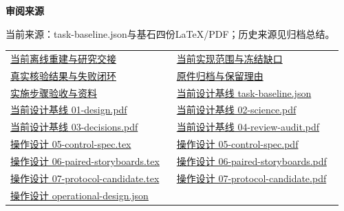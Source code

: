 \documentclass[11pt,a4paper]{article}
\newcommand{\reviewsubsection}[1]{\par\Needspace{4\baselineskip}\vspace{4pt}\begin{center}{\titlelatin\titlecjk\bfseries\fontsize{12}{18}\selectfont #1}\end{center}}
\begin{document}
\begin{minipage}{\linewidth}
\reviewsubsection{3.4 审阅来源}
当前来源：task-\allowbreak{}baseline.json与基石四份LaTeX/\allowbreak{}PDF；历史来源见归档总结。


\begingroup\small\setlength{\tabcolsep}{4pt}\begin{tabular}{@{}p{0.48\linewidth}p{0.48\linewidth}@{}}
\href{file:///D:/Agent/srp/agent/tasks/A-01/outputs/current-rebuild.md}{当前离线重建与研究交接} & \href{file:///D:/Agent/srp/agent/tasks/A-01/outputs/current-rebuild.json}{当前实现范围与冻结缺口}\\[4pt]
\href{file:///D:/Agent/srp/agent/tasks/A-01/evidence/verification.json}{真实核验结果与失败闭环} & \href{file:///D:/Agent/srp/agent/tasks/A-01/archive/README.md}{原件归档与保留理由}\\[4pt]
\href{file:///D:/Agent/srp/agent/tasks/A-01/TASK.md}{实施步骤验收与资料} & \href{file:///D:/Agent/srp/agent/design/design-foundation-20261008/task-baseline.json}{当前设计基线 task-\allowbreak{}baseline.json}\\[4pt]
\href{file:///D:/Agent/srp/agent/design/design-foundation-20261008/01-design.pdf}{当前设计基线 01-\allowbreak{}design.pdf} & \href{file:///D:/Agent/srp/agent/design/design-foundation-20261008/02-science.pdf}{当前设计基线 02-\allowbreak{}science.pdf}\\[4pt]
\href{file:///D:/Agent/srp/agent/design/design-foundation-20261008/03-decisions.pdf}{当前设计基线 03-\allowbreak{}decisions.pdf} & \href{file:///D:/Agent/srp/agent/design/design-foundation-20261008/04-review-audit.pdf}{当前设计基线 04-\allowbreak{}review-\allowbreak{}audit.pdf}\\[4pt]
\href{file:///D:/Agent/srp/agent/design/design-foundation-20261008/05-control-spec.tex}{操作设计 05-\allowbreak{}control-\allowbreak{}spec.tex} & \href{file:///D:/Agent/srp/agent/design/design-foundation-20261008/05-control-spec.pdf}{操作设计 05-\allowbreak{}control-\allowbreak{}spec.pdf}\\[4pt]
\href{file:///D:/Agent/srp/agent/design/design-foundation-20261008/06-paired-storyboards.tex}{操作设计 06-\allowbreak{}paired-\allowbreak{}storyboards.tex} & \href{file:///D:/Agent/srp/agent/design/design-foundation-20261008/06-paired-storyboards.pdf}{操作设计 06-\allowbreak{}paired-\allowbreak{}storyboards.pdf}\\[4pt]
\href{file:///D:/Agent/srp/agent/design/design-foundation-20261008/07-protocol-candidate.tex}{操作设计 07-\allowbreak{}protocol-\allowbreak{}candidate.tex} & \href{file:///D:/Agent/srp/agent/design/design-foundation-20261008/07-protocol-candidate.pdf}{操作设计 07-\allowbreak{}protocol-\allowbreak{}candidate.pdf}\\[4pt]
\href{file:///D:/Agent/srp/agent/design/design-foundation-20261008/operational-design.json}{操作设计 operational-\allowbreak{}design.json} & \\[4pt]
\end{tabular}\endgroup\end{minipage}\par
\end{document}
